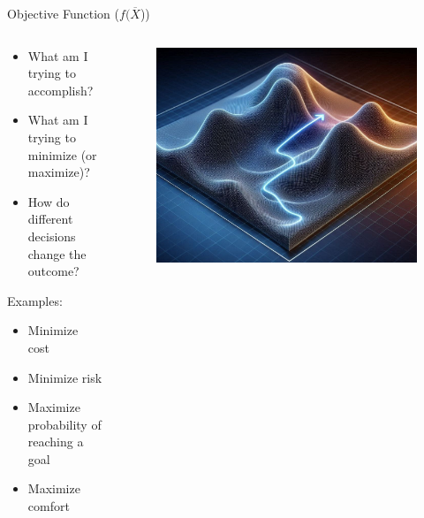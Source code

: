 \documentclass[10pt, aspectratio=169]{beamer}
\begin{document}
\begin{frame}{Objective Function ($f(\overline{X}$))}
    \begin{columns}
        \begin{column}{0.5\textwidth}
            \begin{itemize}
                \item What am I trying to accomplish?
                \item What am I trying to minimize (or maximize)?
                \item How do different decisions change the outcome?
            \end{itemize}
            Examples:
            \begin{itemize}
                \item Minimize cost
                \item Minimize risk
                \item Maximize probability of reaching a goal
                \item Maximize comfort
            \end{itemize}
        \end{column}
        \begin{column}{0.5\textwidth}
            \begin{figure}
                \includegraphics[width=0.8\linewidth]{Mountain.jpeg}
            \end{figure}
        \end{column}
    \end{columns}
\end{frame}
\end{document}
